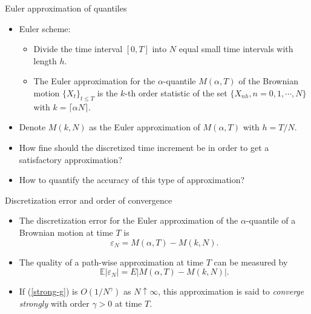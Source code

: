 \documentclass[cjk,10pt]{beamer}
\begin{document}
\begin{frame}{Euler approximation of quantiles}
\begin{itemize}
\item
Euler scheme:
\begin{itemize}
\item
Divide the time interval $[0,T]$ into $N$ equal small time intervals with length $h$. 
\item
The Euler approximation for the $\alpha$-quantile $M(\alpha, T)$ of the Brownian motion $\{X_t\}_{t\leq T}$ is the $k$-th order statistic of the set $\{X_{nh},n=0,1,\cdots,N\}$ with $k= \lceil \alpha  N\rceil$. 
\end{itemize}
\item
Denote $M(k,N)$ as the Euler approximation of $M(\alpha, T)$ with $h=T/N$. 
\item
How fine should the discretized time increment be in order to get a satisfactory approximation?
\item
How to quantify the accuracy of this type of approximation?
\end{itemize}
\end{frame}

\begin{frame}{Discretization error and order of convergence}
\begin{itemize}
\item
The discretization error for the Euler approximation of the $\alpha$-quantile of a Brownian motion at time $T$ is 
\begin{equation}
\varepsilon_N =M(\alpha, T)-M(k,N).
\end{equation}
\item
The quality of a path-wise approximation at time $T$ can be measured by 
\begin{equation}\label{strong-g}
\mathbb E|\varepsilon_N| =E|M(\alpha, T)-M(k,N)|.
\end{equation}
\item
If (\ref{strong-g}) is $O(1/N^\gamma)$ as $N \uparrow \infty$, this approximation is said to {\it converge strongly} with order $\gamma > 0 $ at time $T$.
\end{itemize}
\end{frame}
\end{document}
